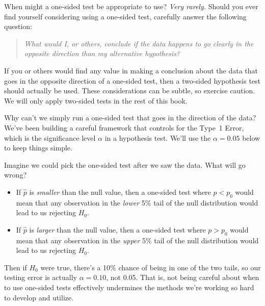 When might a one-sided test be appropriate to use?
\emph{Very rarely.}
Should you ever find yourself considering using a
one-sided test, carefully answer the following question:
\begin{quote}{\em
  What would I, or others, conclude if the data happens
  to go clearly in the opposite direction than my
  alternative hypothesis?
}\end{quote}
If you or others would find any value in making
a conclusion about the data that goes in the opposite
direction of a one-sided test, then a two-sided hypothesis
test should actually be used.
These considerations can be subtle, so exercise caution.
We will only apply two-sided tests in the rest of
this book.

\begin{examplewrap}
\begin{nexample}{
    Why can't we simply run a one-sided
    test that goes in the direction of the data?}
  We've been building a careful framework that
  controls for the Type~1 Error, which is the
  significance level $\alpha$ in a hypothesis test.
  We'll use the $\alpha = 0.05$ below to keep
  things simple.

  Imagine we could pick the one-sided test after
  we saw the data. What will go wrong?
  \begin{itemize}
  \item If $\hat{p}$ is \emph{smaller} than
      the null value,
      then a one-sided test where $p < p_0$ would
      mean that any observation in the
      \emph{lower} 5\% tail of the null distribution
      would lead to us rejecting $H_0$.
  \item If $\hat{p}$ is \emph{larger} than
      the null value,
      then a one-sided test where $p > p_0$ would
      mean that any observation in the
      \emph{upper} 5\% tail of the null distribution
      would lead to us rejecting $H_0$.
  \end{itemize}
  Then if $H_0$ were true, there's a 10\% chance of
  being in one of the two tails, so our testing error
  is actually $\alpha = 0.10$, not 0.05.
  That is,
  not being careful about when to use one-sided tests
  effectively undermines the methods we're working
  so hard to develop and utilize.
\end{nexample}
\end{examplewrap}



{}
